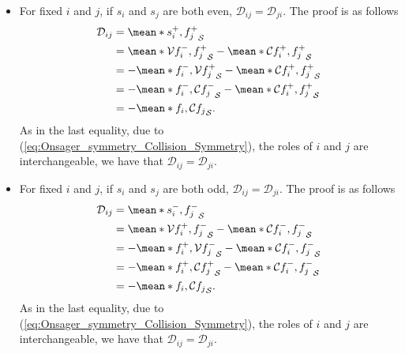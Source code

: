 \begin{itemize}
	\item For fixed $i$ and $j$, if $s_i$ and $s_j$ are both even, $\mathcal{D}_{ij} = \mathcal{D}_{ji}$. The proof is as follows 
	\begin{align*}
		\mathcal{D}_{ij} & = \mean*{s_i^+, f_j^+}_{\mathcal{S}} \\
		& 
		= \mean*{\mathcal{V} f_i^-, f_j^+}_{\mathcal{S}}
		- \mean*{\mathcal{C} f_i^+, f_j^+}_{\mathcal{S}} \\
		& 
		= - \mean*{f_i^-, \mathcal{V} f_j^+}_{\mathcal{S}}
		- \mean*{\mathcal{C} f_i^+, f_j^+}_{\mathcal{S}} \\
		& 
		= - \mean*{f_i^-, \mathcal{C} f_j^-}_{\mathcal{S}}
		- \mean*{\mathcal{C} f_i^+, f_j^+}_{\mathcal{S}}\\
		& 
		= - \mean*{f_i, \mathcal{C} f_j}_{\mathcal{S}}.
	\end{align*}
    As in the last equality, due to (\ref{eq:Onsager_symmetry_Collision_Symmetry}), the roles of $i$ and $j$ are interchangeable, we have that $\mathcal{D}_{ij} = \mathcal{D}_{ji}$.
	
	\item For fixed $i$ and $j$, if $s_i$ and $s_j$ are both odd, $\mathcal{D}_{ij} = \mathcal{D}_{ji}$. The proof is as follows 
	\begin{align*}
		\mathcal{D}_{ij} & = \mean*{s_i^-, f_j^-}_{\mathcal{S}} \\
		& 
		= \mean*{\mathcal{V} f_i^+, f_j^-}_{\mathcal{S}}
		- \mean*{\mathcal{C} f_i^-, f_j^-}_{\mathcal{S}} \\
		& 
		= - \mean*{f_i^+, \mathcal{V} f_j^-}_{\mathcal{S}}
		- \mean*{\mathcal{C} f_i^-, f_j^-}_{\mathcal{S}} \\
		& 
		= - \mean*{f_i^+, \mathcal{C} f_j^+}_{\mathcal{S}}
		- \mean*{\mathcal{C} f_i^-, f_j^-}_{\mathcal{S}} \\
		& 
		= - \mean*{f_i, \mathcal{C} f_j}_{\mathcal{S}}.
	\end{align*}
    As in the last equality, due to (\ref{eq:Onsager_symmetry_Collision_Symmetry}), the roles of $i$ and $j$ are interchangeable, we have that $\mathcal{D}_{ij} = \mathcal{D}_{ji}$.
		

\end{itemize}
